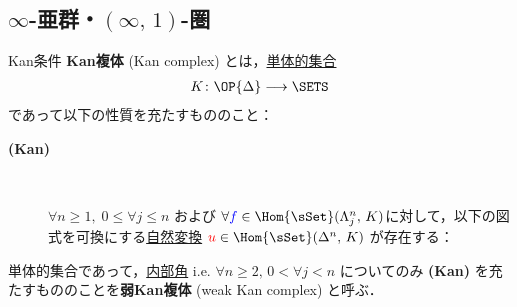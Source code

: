 \documentclass[TQFT_main]{subfiles}
\begin{document}
\subsection{$\infty$-亜群・$(\infty,\, 1)$-圏}

\begin{mydef}[label=def:KanCplx,breakable]{Kan条件}
    \textbf{Kan複体} (Kan complex) とは，\hyperref[def:SimpSet]{単体的集合}
    \begin{align}
        K \colon \OP{\Delta} \lto \SETS
    \end{align}
    であって以下の性質を充たすもののこと：

    \begin{description}
        \item[\textbf{(Kan)}]　
        
        $\forall n \ge 1,\; 0 \le \forall j \le n$ および $\forall \textcolor{blue}{f} \in \Hom{\sSet}(\Lambda^n_j,\, K)$に対して，以下の図式を可換にする\hyperref[def:nat]{自然変換} $\textcolor{red}{u} \in \Hom{\sSet}(\Delta^n,\, K)$ が存在する：
        \begin{center}
        \end{center}
        
    \end{description}
    
    \tcblower

    単体的集合であって，\hyperref[def:horn]{内部角} i.e. $\forall n \ge 2,\, 0 < \forall j < n$ についてのみ \textsf{\textbf{(Kan)}} を充たすもののことを\textbf{弱Kan複体} (weak Kan complex) と呼ぶ．
\end{mydef}
\end{document}
